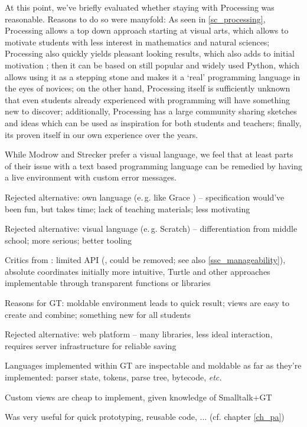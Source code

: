 At this point, we've briefly evaluated whether staying with Processing was reasonable. Reasons to do so were manyfold: As seen in \ref{sc_processing}, Processing allows a top down approach starting at visual arts, which allows to motivate students with less interest in mathematics and natural sciences; Processing also quickly yields pleasant looking results, which also adds to initial motivation \cite{Chi23}; then it can be based on still popular and widely used Python, which allows using it as a stepping stone and makes it a `real' programming language in the eyes of novices; on the other hand, Processing itself is sufficiently unknown that even students already experienced with programming will have something new to discover; additionally, Processing has a large community sharing sketches and ideas which can be used as inspiration for both students and teachers; finally, its proven itself in our own experience over the years.

While Modrow and Strecker prefer a visual language, we feel that at least parts of their issue with a text based programming language can be remedied by having a live environment with custom error messages.


\begin{todo}
\item Rejected alternative: own language (e.\,g. like Grace \cite{Bla18}) -- specification would've been fun, but takes time; lack of teaching materials; less motivating
\item Rejected alternative: visual language (e.\,g. Scratch) -- differentiation from middle school; more serious; better tooling
\item Critics from \cite{Chi23}: limited API (,  could be removed; see also \ref{ssc_manageability}), absolute coordinates initially more intuitive, Turtle and other approaches implementable through transparent functions or libraries
\end{todo}

\begin{todo}
\item Reasons for GT: moldable environment leads to quick result; views are easy to create and combine; something new for all students
\item Rejected alternative: web platform -- many libraries, less ideal interaction, requires server infrastructure for reliable saving

\item Languages implemented within GT are inspectable and moldable as far as they're implemented: parser state, tokens, parse tree, bytecode, \emph{etc.}
\item Custom views are cheap to implement, given knowledge of Smalltalk+GT
\item Was very useful for quick prototyping, reusable code, ... (cf. chapter \ref{ch_pa})
\end{todo}


